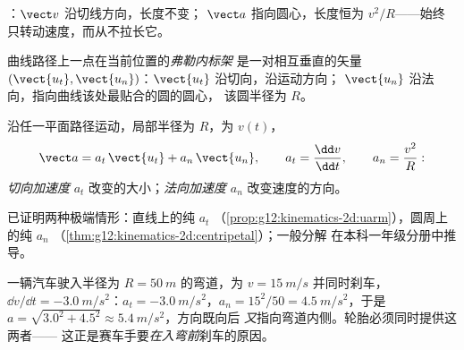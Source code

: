 \begin{omfigure}

{\small {}：$\vect v$ 沿切线方向，长度不变；
$\vect a$ 指向圆心，长度恒为 $v^2/R$——始终
只转动速度，而从不拉长它。}
\end{omfigure}

\begin{definition}[弗勒内标架]\label{def:g12:kinematics-2d:frenet}
曲线路径上一点在当前位置的\emph{弗勒内标架}
是一对相互垂直的矢量
$(\vect{u_t}, \vect{u_n})$：$\vect{u_t}$ 沿切向，沿运动方向；
$\vect{u_n}$ 沿法向，指向曲线该处最贴合的圆的圆心，
该圆半径为 $R$。
\end{definition}

\begin{proposition}[弗勒内标架中的加速度]\label{prop:g12:kinematics-2d:frenetacc}
沿任一平面路径运动，局部半径为 $R$，为 $v(t)$，
\[
\vect a = a_t\,\vect{u_t} + a_n\,\vect{u_n},
\qquad a_t = \frac{\dd v}{\dd t},
\qquad a_n = \frac{v^2}{R}:
\]
\emph{切向加速度}
$a_t$ 改变的大小；\emph{法向加速度}
$a_n$ 改变速度的方向。
\end{proposition}
\admitted

\begin{remark}[证明的出处]\label{rem:g12:kinematics-2d:frenetproof}
已证明两种极端情形：直线上的纯 $a_t$
（\cref{prop:g12:kinematics-2d:uarm}），圆周上的纯 $a_n$
（\cref{thm:g12:kinematics-2d:centripetal}）；一般分解
在本科一年级分册中推导。
\end{remark}

\begin{example}[刹车进入弯道]\label{ex:g12:kinematics-2d:bend}
一辆汽车驶入半径为 $R = \qty{50}{m}$ 的弯道，为 $v = \qty{15}{m/s}$
并同时刹车，$\dd v/\dd t = \qty{-3.0}{m/s^2}$：$a_t =
\qty{-3.0}{m/s^2}$，$a_n = 15^2/50 = \qty{4.5}{m/s^2}$，于是 $a =
\sqrt{3.0^2 + 4.5^2} \approx \qty{5.4}{m/s^2}$，方向既向后
\emph{又}指向弯道内侧。轮胎必须同时提供这两者——
这正是赛车手要\emph{在入弯前}刹车的原因。
\end{example}

